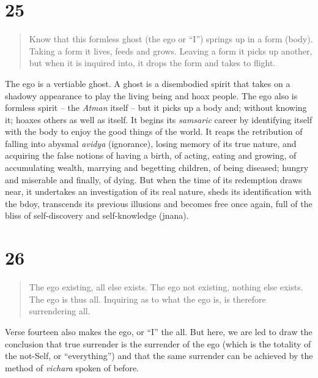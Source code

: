 \documentclass[12pt]{report}
\begin{document}
\section*{25}


\begin{quote}
Know that this formless ghost (the ego or ``I'') springs up in a form
(body). Taking a form it lives, feeds and grows. Leaving a form it
picks up another, but when it is inquired into, it drops the form and
takes to flight.
\end{quote}

The ego is a vertiable ghost. A ghost is a disembodied spirit that
takes on a shadowy appearance to play the living being and hoax
people. The ego also is formless spirit -- the \emph{Atman} itself --
but it picks up a body and; without knowing it; hoaxes others as well
as itself. It begins its \emph{samsaric} career by identifying itself
with the body to enjoy the good things of the world. It reaps the
retribution of falling into abysmal \emph{avidya} (ignorance), losing
memory of its true nature, and acquiring the false notions of having a
birth, of acting, eating and growing, of accumulating wealth, marrying
and begetting children, of being diseased; hungry and miserable and
finally, of dying. But when the time of its redemption draws near, it
undertakes an investigation of its real nature, sheds its
identification with the bdoy, transcends its previous illusions and
becomes free once again, full of the bliss of self-discovery and
self-knowledge (jnana). 


\section*{26}

\begin{quote}
  The ego existing, all else exists. The ego not existing, nothing
  else exists. The ego is thus all. Inquiring as to what the ego is,
  is therefore surrendering all.
\end{quote}

Verse fourteen also makes the ego, or ``I'' the all. But here, we are
led to draw the conclusion that true surrender is the surrender of the
ego (which is the totality of the not-Self, or ``everything'') and
that the same surrender can be achieved by the method of
\emph{vichara} spoken of before.

\end{document}
